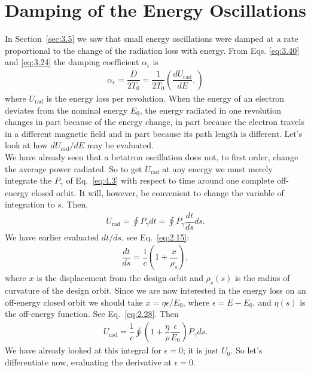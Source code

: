 \section{Damping of the Energy Oscillations}\label{sec:4.2}

In Section~\ref{sec:3.5} we saw that small energy oscillations were damped at a rate proportional
 to the change of the radiation loss with energy. From Eqs. \eqref{eq:3.40} and \eqref{eq:3.24} the damping coefficient $\alpha_\epsilon$ is
\begin{align}
	\alpha_\epsilon = \dfrac{D}{2 T_0} = \dfrac{1}{2 T_0} \left( \dfrac{d U_\text{rad}}{d E}, \right)
\end{align}
where $U_\text{rad}$ is the energy loss per revolution. When the energy of an electron deviates from the nominal energy $E_0$, the energy radiated in one revolution changes in part because of the energy change, in part because the electron travels in a different magnetic field and in part because its path length is different. Let’s look at how $dU_\text{rad}/dE$ may be evaluated.\\
We have already seen that a betatron oscillation does not, to first order, change the average power radiated. So to get $U_\text{rad}$ at any energy we must merely integrate the $P_\gamma$ of Eq.~\eqref{eq:4.3} with respect to time around one complete off-energy closed orbit. It will, however, be convenient to change the variable of integration to $s$. Then,
\begin{align}
	U_\text{rad} = \oint P_\gamma dt = \oint P_\gamma \dfrac{dt}{ds} ds.
\end{align}
We have earlier evaluated $dt/ds$, see Eq.~\eqref{eq:2.15}:
\begin{align*}
	\dfrac{dt}{ds} = \dfrac{1}{c} \left( 1 + \dfrac{x}{\rho_s} \right),
\end{align*}
where $x$ is the displacement from the design orbit and $\rho_s(s)$ is the radius of curvature of the design orbit. Since we are now interested in the energy loss on an off-energy closed orbit we should take $x = \eta \epsilon/E_0$, where $\epsilon = E - E_0$. and $\eta(s)$ is
the off-energy function. See Eq.~\eqref{eq:2.28}. Then
\begin{align}
	U_\text{rad} = \dfrac{1}{c} \oint \left( 1 + \dfrac{\eta}{\rho} \dfrac{\epsilon}{E_0} \right) P_\gamma ds.
\end{align}
We have already looked at this integral for $\epsilon = 0$; it is just $U_0$. So let’s differentiate now, evaluating the derivative at $\epsilon = 0$.
